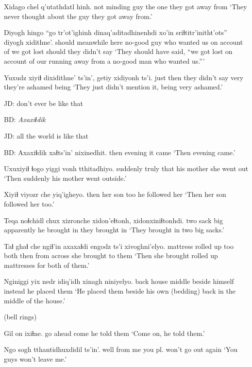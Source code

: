 \documentclass[12pt]{article}
\begin{document}
\gll Xidago      chel {q'utathdatl hinh}.
{not minding} guy  {the one they got away from}
\glt `They never thought about the guy they got away from.'
\glend

\gll Diyogh      hingo     ``go   tr'ot'ighinh dinaq'aditadhinenhdi xo'in       sriɬtitr'initht'ots'' diyogh xidithne'.
should meanwhile here  {no-good guy}  {who wanted us} {on account of} {we got lost} should {they didn't say}
\glt `They should have said, ``we got lost on account of our running away from a no-good man who wanted us.'''
\glend

\gll Yuxudz xiyiɬ {dixidithne' ts'in'}, getiy xidiyonh ts'i. 
just   then  {they didn't say }   very  {they're ashamed} being
\glt `They just didn't mention it, being very ashamed.'
\glend

JD:  don't ever be like that

BD:  \em Axaxiɬdik \em 

JD:  all the world is like that

BD:
\gll Axaxiɬdik xaɬts'in' nixinedhit.
then      evening  {it came}
\glt `Then evening came.'
\glend

\gll Uxuxiyiɬ ɬogo  yiggi vonh       tthitadhiyo.
suddenly truly that  {his mother} {she went out}
\glt `Then suddenly his mother went outside.'
\glend

\gll Xiyiɬ viyozr  che yiq'igheyo.
then  {her son} too {he followed her}
\glt `Then her son followed her too.'
\glend

\gll Teqa noɬchidl chux xizronche xidon'eɬtonh, xidonxiniɬtonhdi.
two  sack     big    apparently        {he brought in} {they brought in}
\glt `They brought in two big sacks.'
\glend

\gll Taɬ ghaɬ        che ngiɬ'in axaxaɬdi {engodz ts'i} xivoghni'elyo.
mattress {rolled up} too both    then     {from across}      {she brought to them}
\glt `Then she brought rolled up mattresses for both of them.'
\glend

\gll Nginiggi yix   nedr   idiq'idh        xinagh  niniyelyo.
back     house middle {beside himself} instead {he placed them}
\glt `He placed them beside his own (bedding) back in the middle of the house.'
\glend

(bell rings)

\gll Gil      on   ixiɬne.
{go ahead} come {he told them}
\glt `Come on, he told them.'
\glend

\gll Ngo  sogh {tthantidhuxdidil ts'in'.}
well {from me} {you pl. won't go out again}
\glt `You guys won't leave me.'
\glend
\end{document}
